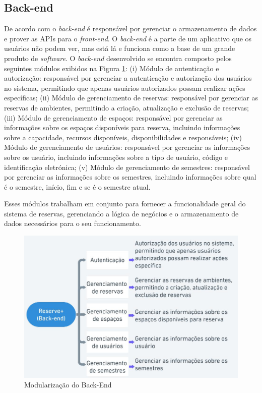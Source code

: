 \documentclass[12pt]{article}
\begin{document}
\subsection{Back-end}\label{sec:back_end}

De acordo com \cite{clark} o \textit{back-end} é responsável por gerenciar o armazenamento de dados e prover as APIs para o \textit{front-end}. O \textit{back-end} é a parte de um aplicativo que os usuários não podem ver, mas está lá e funciona como a base de um grande produto de \textit{software}. O \textit{back-end} desenvolvido se encontra composto pelos seguintes módulos exibidos na Figura \ref{fig:back_end}:
(i) Módulo de autenticação e autorização: responsável por gerenciar a autenticação e autorização dos usuários no sistema, permitindo que apenas usuários autorizados possam realizar ações específicas; (ii) Módulo de gerenciamento de reservas: responsável por gerenciar as reservas de ambientes, permitindo a criação, atualização e exclusão de reservas; (iii) Módulo de gerenciamento de espaços: responsável por gerenciar as informações sobre os espaços disponíveis para reserva, incluindo informações sobre a capacidade, recursos disponíveis, disponibilidades e responsáveis; (iv) Módulo de gerenciamento de usuários: responsável por gerenciar as informações sobre os usuário, incluindo informações sobre a tipo de usuário, código e identificação eletrónica; (v) Módulo de gerenciamento de semestres: responsável por gerenciar as informações sobre os semestres, incluindo informações sobre qual é o semestre, início, fim e se é o semestre atual.

Esses módulos trabalham em conjunto para fornecer a funcionalidade geral do sistema de reservas, gerenciando a lógica de negócios e o armazenamento de dados necessários para o seu funcionamento.

\begin{figure}[ht]
\centering
\includegraphics[width=1.0\textwidth]{back_end.jpg}
\caption{Modularização do Back-End}
\label{fig:back_end}
\end{figure}
\end{document}
